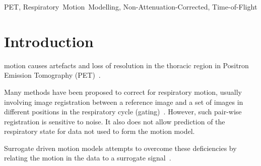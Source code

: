 \documentclass[journal]{IEEEtran}
\begin{document}
\begin{IEEEkeywords}
PET, Respiratory~Motion~Modelling, Non-Attenuation-Corrected, Time-of-Flight
\end{IEEEkeywords}


\section{Introduction}
% 
% 
% 
% 

 motion causes artefacts and loss of resolution in the thoracic region in Positron Emission Tomography (PET)~\cite{Nehmeh2008}.%

Many methods have been proposed to correct for respiratory motion, usually involving image registration between a reference image and a set of images in different positions in the respiratory cycle (gating)~\cite{Oliveira2014}. However, such pair-wise registration is sensitive to noise. It also does not allow prediction of the respiratory state for data not used to form the motion model.

Surrogate driven motion models attempts to overcome these deficiencies by relating the motion in the data to a surrogate signal~\cite{McClelland2013}.%
\end{document}
